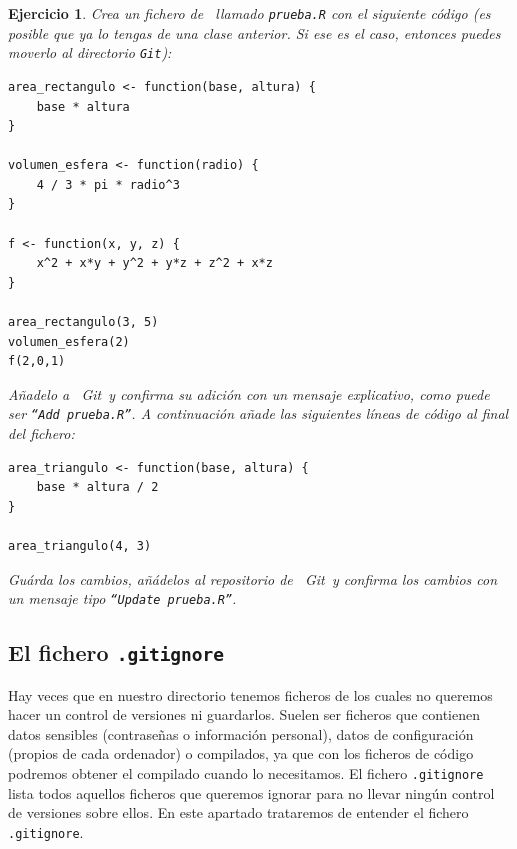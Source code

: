 \documentclass[11pt,a4paper]{article}
\newcommand{\R}{\textcolor{azuluc}{\faIcon{r-project}}}
\newcommand{\Git}{\textcolor{git}{\faIcon{git-alt}}~\!Git}
\theoremstyle{exercise}
\newtheorem{exercise}{Ejercicio}
\begin{document}
\begin{exercise} Crea un fichero de \R\ llamado \texttt{prueba.R} con el siguiente código (es posible que ya lo tengas de una clase anterior. Si ese es el caso, entonces puedes moverlo al directorio \texttt{Git}):

\begin{lstlisting}[style=rstyle]
area_rectangulo <- function(base, altura) {
	base * altura
}

volumen_esfera <- function(radio) {
	4 / 3 * pi * radio^3
}

f <- function(x, y, z) {
	x^2 + x*y + y^2 + y*z + z^2 + x*z
}

area_rectangulo(3, 5)
volumen_esfera(2)
f(2,0,1)
\end{lstlisting}

\noindent Añadelo a \Git\ y confirma su adición con un mensaje explicativo, como puede ser \texttt{``Add prueba.R''}. A continuación añade las siguientes líneas de código al final del fichero:

\begin{lstlisting}[style=rstyle]
area_triangulo <- function(base, altura) {
	base * altura / 2
}

area_triangulo(4, 3)
\end{lstlisting}

\noindent Guárda los cambios, añádelos al repositorio de \Git\ y confirma los cambios con un mensaje tipo \texttt{``Update prueba.R''}.
\end{exercise}


\subsection{El fichero \texttt{.gitignore}}

Hay veces que en nuestro directorio tenemos ficheros de los cuales no queremos hacer un control de versiones ni guardarlos. Suelen ser ficheros que contienen datos sensibles (contraseñas o información personal), datos de configuración (propios de cada ordenador) o compilados, ya que con los ficheros de código podremos obtener el compilado cuando lo necesitamos. El fichero \texttt{.gitignore} lista todos aquellos ficheros que queremos ignorar para no llevar ningún control de versiones sobre ellos. En este apartado trataremos de entender el fichero \texttt{.gitignore}. 
\end{document}
